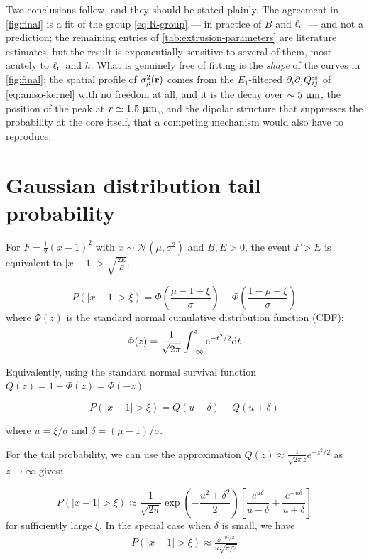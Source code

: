 \documentclass[a5paper]{article}
\begin{document}
Two conclusions follow, and they should be stated plainly. The agreement in \cref{fig:final} is a fit of the group \eqref{eq:R-group} --- in practice of $B$ and $\elln$ --- and not a prediction; the remaining entries of \cref{tab:extrusion-parameters} are literature estimates, but the result is exponentially sensitive to several of them, most acutely to $\elln$ and $h$. What is genuinely free of fitting is the \emph{shape} of the curves in \cref{fig:final}: the spatial profile of $\sigmarho(\r)$ comes from the $E_1$-filtered $\partial_i\partial_jQ^\ss_{ij}$ of \eqref{eq:aniso-kernel} with no freedom at all, and it is the decay over $\sim5~\micron$, the position of the peak at $r\simeq1.5~\micron$,, and the dipolar structure that suppresses the probability at the core itself, that a competing mechanism would also have to reproduce.



\appendix

\section{Gaussian distribution tail probability}
\label{appendix-gaussian-distribution}

For $F = \frac{1}{2}(x-1)^2$ with $x \sim \mathcal{N}(\mu, \sigma^2)$ and $B, E > 0$, the event $F > E$ is equivalent to $\vert{}x - 1\vert{} > \sqrt{\frac{2E}{B}}$.


$$P(|x-1| > \xi) = \Phi\left(\frac{\mu - 1 - \xi}{\sigma}\right) + \Phi\left(\frac{1 - \mu - \xi}{\sigma}\right)$$
where $\Phi(z)$ is the standard normal cumulative distribution function (CDF):
\begin{align}
    \Phi(z) = \frac{1}{\sqrt{2\pi}} \int_{-\infty}^z \ee^{-t^2/2} \d t
\end{align}


Equivalently, using the standard normal survival function $Q(z) = 1 - \Phi(z) = \Phi(-z)$




$$P(|x-1|>\xi) = Q\left(u - \delta\right) + Q\left(u + \delta\right)$$

where $u = \xi/\sigma$ and $\delta = (\mu - 1)/\sigma$.

For the tail probability, we can use the approximation $Q(z) \approx \frac{1}{\sqrt{2\pi} z} e^{-z^2/2}$ as $z \to \infty$ gives:

$$P(|x-1|>\xi) \approx \frac{1}{\sqrt{2\pi}} \exp\left(-\frac{u^2 + \delta^2}{2}\right) \left[ \frac{e^{u\delta}}{u - \delta} + \frac{e^{-u\delta}}{u + \delta} \right]$$
for sufficiently large $\xi$. In the special case when $\delta$ is small, we have
\begin{align}
P(|x-1|>\xi) \approx \frac{\ee^{-u^2/2}}{u\sqrt{\pi/2}} 
\end{align}
\end{document}
